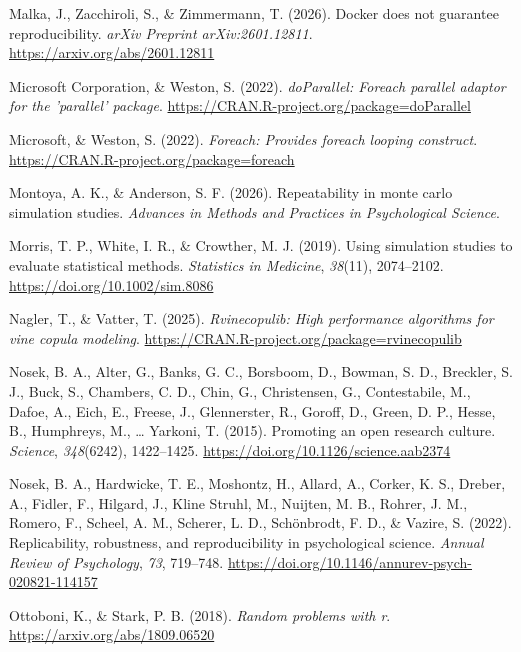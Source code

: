 \documentclass[
  man,
  longtable,
  nolmodern,
  notxfonts,
  notimes,
  colorlinks=true,linkcolor=blue,citecolor=blue,urlcolor=blue]{apa7}
\newlength{\cslhangindent}
\newenvironment{CSLReferences}[2] %
 {\begin{list}{}{%
  \setlength{\itemindent}{0pt}
  \setlength{\leftmargin}{0pt}
  \setlength{\parsep}{0pt}
  \ifodd #1
   \setlength{\leftmargin}{\cslhangindent}
   \setlength{\itemindent}{-1\cslhangindent}
  \fi
  \setlength{\itemsep}{#2\baselineskip}}}
 {\end{list}}
\begin{document}
\begin{CSLReferences}{1}{0}
Malka, J., Zacchiroli, S., \& Zimmermann, T. (2026). {Docker} does not
guarantee reproducibility. \emph{arXiv Preprint arXiv:2601.12811}.
\url{https://arxiv.org/abs/2601.12811}

Microsoft Corporation, \& Weston, S. (2022). \emph{doParallel: Foreach
parallel adaptor for the 'parallel' package}.
\url{https://CRAN.R-project.org/package=doParallel}

Microsoft, \& Weston, S. (2022). \emph{Foreach: Provides foreach looping
construct}. \url{https://CRAN.R-project.org/package=foreach}

Montoya, A. K., \& Anderson, S. F. (2026). Repeatability in monte carlo
simulation studies. \emph{Advances in Methods and Practices in
Psychological Science}.

Morris, T. P., White, I. R., \& Crowther, M. J. (2019). Using simulation
studies to evaluate statistical methods. \emph{Statistics in Medicine},
\emph{38}(11), 2074--2102. \url{https://doi.org/10.1002/sim.8086}

Nagler, T., \& Vatter, T. (2025). \emph{Rvinecopulib: High performance
algorithms for vine copula modeling}.
\url{https://CRAN.R-project.org/package=rvinecopulib}

Nosek, B. A., Alter, G., Banks, G. C., Borsboom, D., Bowman, S. D.,
Breckler, S. J., Buck, S., Chambers, C. D., Chin, G., Christensen, G.,
Contestabile, M., Dafoe, A., Eich, E., Freese, J., Glennerster, R.,
Goroff, D., Green, D. P., Hesse, B., Humphreys, M., \ldots{} Yarkoni, T.
(2015). Promoting an open research culture. \emph{Science},
\emph{348}(6242), 1422--1425.
\url{https://doi.org/10.1126/science.aab2374}

Nosek, B. A., Hardwicke, T. E., Moshontz, H., Allard, A., Corker, K. S.,
Dreber, A., Fidler, F., Hilgard, J., Kline Struhl, M., Nuijten, M. B.,
Rohrer, J. M., Romero, F., Scheel, A. M., Scherer, L. D., Schönbrodt, F.
D., \& Vazire, S. (2022). Replicability, robustness, and reproducibility
in psychological science. \emph{Annual Review of Psychology}, \emph{73},
719--748. \url{https://doi.org/10.1146/annurev-psych-020821-114157}

Ottoboni, K., \& Stark, P. B. (2018). \emph{Random problems with r}.
\url{https://arxiv.org/abs/1809.06520}


\end{CSLReferences}
\end{document}

